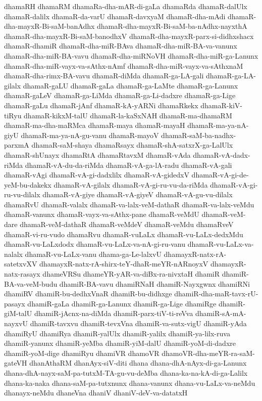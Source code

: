 {dhamaRH
dhamaRM
dhamaRa-dha-mAR-di-gaLa
dhamaRda
dhamaR-dalUlx
dhamaR-dalilx
dhamaR-da-varU
dhamaR-davxyaM
dhamaR-dha-mAdi
dhamaR-dha-mayxR-Bi-saM-banAdhx
dhamaR-dha-mayxR-Bi-saM-ba-nAdhx-nayxthA
dhamaR-dha-mayxR-Bi-saM-banodhxV
dhamaR-dha-mayxR-parx-si-didhxshacx
dhamaR-dhamiR
dhamaR-dha-miR-BAva
dhamaR-dha-miR-BA-va-vanunx
dhamaR-dha-miR-BA-vavu
dhamaR-dha-miRNoVH
dhamaR-dha-miR-ga-Lanunx
dhamaR-dha-miR-vayx-va-sAthx-nAmf
dhamaR-dha-miR-vayx-va-sAthxnaM
dhamaR-dha-rimx-BA-vavu
dhamaR-diMda
dhamaR-ga-LA-gali
dhamaR-ga-LA-gilalx
dhamaR-gaLU
dhamaR-gaLa
dhamaR-ga-LaMte
dhamaR-ga-Lanunx
dhamaR-gaLeV
dhamaR-ga-LiMda
dhamaR-ga-Li-dadxre
dhamaR-ga-Lige
dhamaR-gaLu
dhamaR-jAnf
dhamaR-kA-yARNi
dhamaRkekx
dhamaR-kiV-tiRyu
dhamaR-kikxM-talU
dhamaR-la-kaSxNAH
dhamaR-ma-dhamaRM
dhamaR-ma-dha-maRMca
dhamaR-maya
dhamaR-mayaH
dhamaR-ma-ya-nA-giyU
dhamaR-ma-ya-nA-gu-vanu
dhamaR-mayoV
dhamaR-saM-ba-nadhx-parxmA
dhamaR-saM-shaya
dhamaRsayx
dhamaR-shA-satxrX-ga-LalUlx
dhamaR-shUnayx
dhamaRtA
dhamaRtavxM
dhamaR-vAda
dhamaR-vA-dadx-riMda
dhamaR-vA-du-da-riMda
dhamaR-vA-ga-lA-radu
dhamaR-vA-gali
dhamaR-vAgi
dhamaR-vA-gi-dadxlilx
dhamaR-vA-gidedxV
dhamaR-vA-gi-de-yeM-bu-dakekx
dhamaR-vA-gilalx
dhamaR-vA-gi-ru-vu-da-riMda
dhamaR-vA-gi-ru-vu-dilalx
dhamaR-vA-giye
dhamaR-vA-giyeV
dhamaR-vA-gu-vu-dilalx
dhamaRvU
dhamaR-valalx
dhamaR-va-lalx-veM-dathaR
dhamaR-va-lalx-veMdu
dhamaR-vanunx
dhamaR-vayx-va-sAthx-pane
dhamaR-veMdU
dhamaR-veM-dare
dhamaR-veM-dathaR
dhamaR-veMdeV
dhamaR-veMdu
dhamaRveV
dhamaR-vi-ru-vudo
dhamaRvu
dhamaR-vuLaLx
dhamaR-vu-LaLx-dedxMdu
dhamaR-vu-LaLxdodx
dhamaR-vu-LaLx-va-nA-gi-ru-vanu
dhamaR-vu-LaLx-va-nalalx
dhamaR-vu-LaLx-vanu
dhama-ga-Le-lalxvU
dhamayxR-natx-rA-satetxvXV
dhamayxR-natx-rA-shirx-teY-dhaR-meYR-nARnoyxV
dhamayxR-natx-rasayx
dhameVRSu
dhameYR-yAR-va-diBx-ra-nivxtaH
dhamiR
dhamiR-BA-va-veM-budu
dhamiR-BA-vavu
dhamiRNaH
dhamiR-Nayxgwnx
dhamiRNi
dhamiRV
dhamiR-bu-dedhxVnaR
dhamiR-bu-didhxge
dhamiR-dha-maR-tavx-rU-pasayx
dhamiR-gaLa
dhamiR-ga-Lanunx
dhamiR-ga-Lige
dhamiRge
dhamiR-giM-talU
dhamiR-jAcnx-na-diMda
dhamiR-parx-tiV-ti-reVva
dhamiR-sA-mA-nayxvU
dhamiR-tavxvu
dhamiR-tevxVna
dhamiR-va-sutx-vigU
dhamiR-yAda
dhamiRyU
dhamiRya
dhamiR-yalUlx
dhamiR-yalilx
dhamiR-ya-lilx-ruva
dhamiR-yanunx
dhamiR-yeMba
dhamiR-yiM-dalU
dhamiR-yoM-di-dadxre
dhamiR-yoM-dige
dhamiRyu
dhamiVR
dhamoVR
dhamoVR-dha-meYR-ra-saM-gateVH
dhanAthaRM
dhanAyx-siV-diti
dhana
dhana-dhA-nAyx-di-ga-Lanunx
dhana-dhA-nayx-saM-pa-tutxM-TA-gu-vu-deMba
dhana-ka-na-kA-di-ga-Lalilx
dhana-ka-naka
dhana-saM-pa-tutxnunx
dhana-vanunx
dhana-vu-LaLx-va-neMdu
dhanayx-neMdu
dhaneVna
dhaniV
dhaniV-deV-va-datatxH
}

